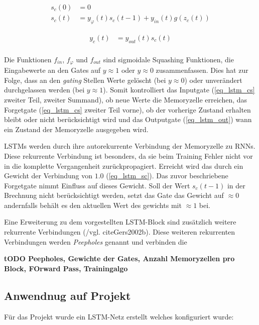 \begin{equation}
\label{eq_lstm_cs}
\begin{split}
s_{c}(0) &= 0\\
s_{c}(t) &= y_{\varphi}(t)s_{c}(t-1) +
y_{in}(t)g(z_{c}(t))
\end{split}
\end{equation}

\begin{equation}
\label{eq_lstm_out}
\begin{split}
y_{c}(t) &= y_{out}(t)s_{c}(t)\\
\end{split}
\end{equation}

Die Funktionen $f_{in}$, $f_{\varphi}$ und $f_{out}$ sind sigmoidale Squashing
Funktionen, die Eingabewerte an den Gates auf $y\approx1$ oder $y\approx0$
zusammenfassen. Dies hat zur Folge, dass an den \textit{gating} Stellen Werte
gelöscht (bei $y\approx0$) oder unverändert durchgelassen werden (bei
$y\approx1$). Somit kontrolliert das Inputgate (\autoref{eq_lstm_cs} zweiter
Teil, zweiter Summand), ob neue Werte die Memoryzelle erreichen, das Forgetgate
(\autoref{eq_lstm_cs} zweiter Teil vorne), ob der vorherige Zustand erhalten
bleibt oder nicht berücksichtigt wird und das Outputgate (\autoref{eq_lstm_out})
wann ein Zustand der Memoryzelle ausgegeben wird.

\acp{LSTM} werden durch ihre autorekurrente Verbindung der Memoryzelle zu
\acp{RNN}. Diese rekurrente Verbindung ist besonders, da sie beim Training
Fehler nicht vor in die komplette Vergangenheit zurückpropagiert. Erreicht wird
das durch ein Gewicht der Verbindung von $1.0$ (\autoref{eq_lstm_sc}). Das zuvor
beschriebene Forgetgate nimmt Einfluss auf dieses Gewicht. Soll der Wert
$s_c(t-1)$ in der Brechnung nicht berücksichtigt werden, setzt das Gate das
Gewicht auf $\approx0$ andernfalls behält es den aktuellen Wert des gewichts mit
$\approx1$ bei. 

Eine Erweiterung zu dem vorgestellten \ac{LSTM}-Block sind zusätzlich weitere
rekurrente Verbindungen (/vgl. cite{Gers2002b}). Diese weiteren rekurrenten
Verbindungen werden \textit{Peepholes} genannt und verbinden die 

\textbf{tODO Peepholes, Gewichte der Gates, Anzahl Memoryzellen pro Block,
FOrward Pass, Trainingalgo}

\subsection{Anwendnug auf Projekt}
Für das Projekt wurde ein LSTM-Netz erstellt welches konfiguriert wurde:

